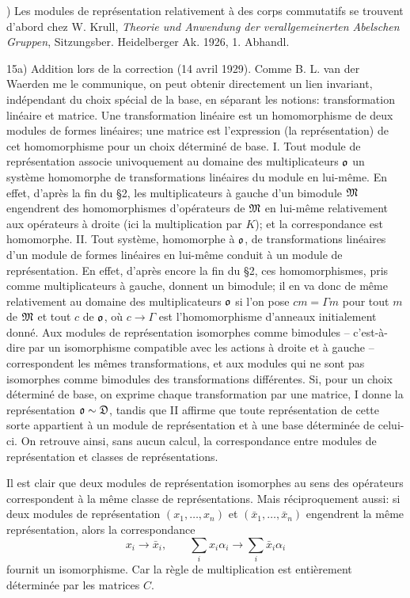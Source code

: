 {\footnotesize{}) Les modules de représentation relativement à des corps commutatifs se trouvent d'abord chez W. Krull, \emph{Theorie und Anwendung der verallgemeinerten Abelschen Gruppen}, Sitzungsber. Heidelberger Ak. 1926, 1. Abhandl.\par
15a) Addition lors de la correction (14 avril 1929). Comme B. L. van der Waerden me le communique, on peut obtenir directement un lien invariant, indépendant du choix spécial de la base, en séparant les notions: transformation linéaire et matrice. Une transformation linéaire est un homomorphisme de deux modules de formes linéaires; une matrice est l'expression (la représentation) de cet homomorphisme pour un choix déterminé de base. I. Tout module de représentation associe univoquement au domaine des multiplicateurs $\mathfrak{o}$ un système homomorphe de transformations linéaires du module en lui-même. En effet, d'après la fin du \S{}2, les multiplicateurs à gauche d'un bimodule $\mathfrak{M}$ engendrent des homomorphismes d'opérateurs de $\mathfrak{M}$ en lui-même relativement aux opérateurs à droite (ici la multiplication par $K$); et la correspondance est homomorphe. II. Tout système, homomorphe à $\mathfrak{o}$, de transformations linéaires d'un module de formes linéaires en lui-même conduit à un module de représentation. En effet, d'après encore la fin du \S{}2, ces homomorphismes, pris comme multiplicateurs à gauche, donnent un bimodule; il en va donc de même relativement au domaine des multiplicateurs $\mathfrak{o}$ si l'on pose $cm=\Gamma m$ pour tout $m$ de $\mathfrak{M}$ et tout $c$ de $\mathfrak{o}$, où $c\to\Gamma$ est l'homomorphisme d'anneaux initialement donné. Aux modules de représentation isomorphes comme bimodules -- c'est-à-dire par un isomorphisme compatible avec les actions à droite et à gauche -- correspondent les mêmes transformations, et aux modules qui ne sont pas isomorphes comme bimodules des transformations différentes. Si, pour un choix déterminé de base, on exprime chaque transformation par une matrice, I donne la représentation $\mathfrak{o}\sim\mathfrak D$, tandis que II affirme que toute représentation de cette sorte appartient à un module de représentation et à une base déterminée de celui-ci. On retrouve ainsi, sans aucun calcul, la correspondance entre modules de représentation et classes de représentations.\par}

Il est clair que deux modules de représentation isomorphes au sens des opérateurs correspondent à la même classe de représentations. Mais réciproquement aussi: si deux modules de représentation $(x_1,\ldots,x_n)$ et $(\bar x_1,\ldots,\bar x_n)$ engendrent la même représentation, alors la correspondance
\[
        x_i\to\bar x_i,
        \qquad
        \sum_i x_i\alpha_i\to\sum_i\bar x_i\alpha_i
\]
fournit un isomorphisme. Car la règle de multiplication est entièrement déterminée par les matrices $C$.

